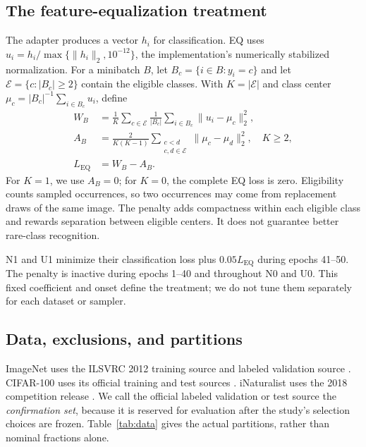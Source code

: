 \documentclass[conference]{IEEEtran}
\begin{document}
\subsection{The feature-equalization treatment}
The adapter produces a vector $h_i$ for classification. EQ uses $u_i=h_i/\max\{\|h_i\|_2,10^{-12}\}$, the implementation's numerically stabilized normalization. For a minibatch $B$, let $B_c=\{i\in B:y_i=c\}$ and let $\mathcal E=\{c:|B_c|\geq2\}$ contain the eligible classes. With $K=|\mathcal E|$ and class center $\mu_c=|B_c|^{-1}\sum_{i\in B_c}u_i$, define
\begin{align}
W_B&=\frac{1}{K}\sum_{c\in\mathcal E}\frac{1}{|B_c|}\sum_{i\in B_c}\|u_i-\mu_c\|_2^2,\\
A_B&=\frac{2}{K(K-1)}\sum_{\substack{c<d\\c,d\in\mathcal E}}\|\mu_c-\mu_d\|_2^2,\quad K\geq2,\\
L_{\mathrm{EQ}}&=W_B-A_B.
\label{eq:eq}
\end{align}
For $K=1$, we use $A_B=0$; for $K=0$, the complete EQ loss is zero. Eligibility counts sampled occurrences, so two occurrences may come from replacement draws of the same image. The penalty adds compactness within each eligible class and rewards separation between eligible centers. It does not guarantee better rare-class recognition.

N1 and U1 minimize their classification loss plus $0.05L_{\mathrm{EQ}}$ during epochs 41--50. The penalty is inactive during epochs 1--40 and throughout N0 and U0. This fixed coefficient and onset define the treatment; we do not tune them separately for each dataset or sampler.

\subsection{Data, exclusions, and partitions}
ImageNet uses the ILSVRC 2012 training source and labeled validation source \cite{russakovsky2015}. CIFAR-100 uses its official training and test sources \cite{krizhevsky2009}. iNaturalist uses the 2018 competition release \cite{inat2018}. We call the official labeled validation or test source the \emph{confirmation set}, because it is reserved for evaluation after the study's selection choices are frozen. Table~\ref{tab:data} gives the actual partitions, rather than nominal fractions alone.
\end{document}

